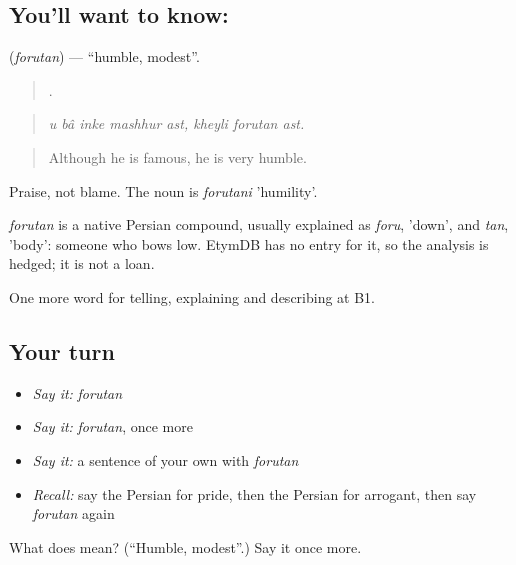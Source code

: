 \subsection*{You'll want to know: }
\textbf{} (\emph{forutan}) — \textquotedblleft{}humble, modest\textquotedblright{}.

\begin{quote}
       .
\end{quote}

\begin{quote}
\emph{u bâ inke mashhur ast, kheyli forutan ast.}
\end{quote}

\begin{quote}
Although he is famous, he is very humble.
\end{quote}

Praise, not blame. The noun is \emph{forutani} 'humility'.

\begin{cousinweb}
\emph{forutan} is a native Persian compound, usually explained as \emph{foru}, 'down', and \emph{tan}, 'body': someone who bows low. EtymDB has no entry for it, so the analysis is hedged; it is not a loan.
\end{cousinweb}

\begin{grammarlens}[title={What you've built}]
One more word for telling, explaining and describing at B1.
\end{grammarlens}

\subsection*{Your turn}
\begin{itemize}
\raggedright
  \item \emph{Say it:} \emph{forutan}
  \item \emph{Say it:} \emph{forutan}, once more
  \item \emph{Say it:} a sentence of your own with \emph{forutan}
  \item \emph{Recall:} say the Persian for pride, then the Persian for arrogant, then say \emph{forutan} again
\end{itemize}

\begin{tcolorbox}[breakable,colback=teal!4,colframe=teal!35!black,title={Before you move on}]
What does  mean? (\textquotedblleft{}Humble, modest\textquotedblright{}.) Say it once more.
\end{tcolorbox}
